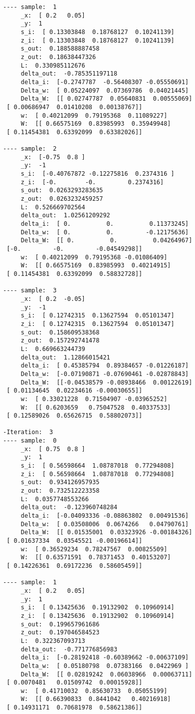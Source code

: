 \documentclass[10pt]{article}
\begin{document}
\begin{multicols}{3}
\begin{tiny}
\begin{verbatim}
---- sample:  1
     _x:  [ 0.2   0.05]
     _y:  1
     s_i:  [ 0.13303848  0.18768127  0.10241139]
     z_i:  [ 0.13303848  0.18768127  0.10241139]
     s_out:  0.188588887458
     z_out:  0.18638447326
     L:  0.330985112676
     delta_out:  -0.785351197118
     delta_i:  [-0.2747787  -0.56408307 -0.05550691]
     Delta_w:  [ 0.05224097  0.07369786  0.04021445]
     Delta_W:  [[ 0.02747787  0.05640831  0.00555069]
 [ 0.00686947  0.01410208  0.00138767]]
     w:  [ 0.40212099  0.79195368  0.11089227]
     W:  [[ 0.66575169  0.83985993  0.35949948]
 [ 0.11454381  0.63392099  0.63382026]]

---- sample:  2
     _x:  [-0.75  0.8 ]
     _y:  -1
     s_i:  [-0.40767872 -0.12275816  0.2374316 ]
     z_i:  [-0.        -0.         0.2374316]
     s_out:  0.0263293283635
     z_out:  0.0263232459257
     L:  0.526669702564
     delta_out:  1.02561209292
     delta_i:  [ 0.          0.          0.11373245]
     Delta_w:  [ 0.          0.         -0.12175636]
     Delta_W:  [[ 0.          0.          0.04264967]
 [-0.         -0.         -0.04549298]]
     w:  [ 0.40212099  0.79195368 -0.01086409]
     W:  [[ 0.66575169  0.83985993  0.40214915]
 [ 0.11454381  0.63392099  0.58832728]]

---- sample:  3
     _x:  [ 0.2  -0.05]
     _y:  -1
     s_i:  [ 0.12742315  0.13627594  0.05101347]
     z_i:  [ 0.12742315  0.13627594  0.05101347]
     s_out:  0.158609538368
     z_out:  0.157292741478
     L:  0.669663244739
     delta_out:  1.12866015421
     delta_i:  [ 0.45385794  0.89384657 -0.01226187]
     Delta_w:  [-0.07190871 -0.07690461 -0.02878843]
     Delta_W:  [[-0.04538579 -0.08938466  0.00122619]
 [ 0.01134645  0.02234616 -0.00030655]]
     w:  [ 0.33021228  0.71504907 -0.03965252]
     W:  [[ 0.6203659   0.75047528  0.40337533]
 [ 0.12589026  0.65626715  0.58802073]]

-Iteration:  3
---- sample:  0
     _x:  [ 0.75  0.8 ]
     _y:  1
     s_i:  [ 0.56598664  1.08787018  0.77294808]
     z_i:  [ 0.56598664  1.08787018  0.77294808]
     s_out:  0.934126957935
     z_out:  0.732512223358
     L:  0.0357748553266
     delta_out:  -0.123960748284
     delta_i:  [-0.04093336 -0.08863802  0.00491536]
     Delta_w:  [ 0.03508006  0.0674266   0.04790761]
     Delta_W:  [[ 0.01535001  0.03323926 -0.00184326]
 [ 0.01637334  0.03545521 -0.00196614]]
     w:  [ 0.36529234  0.78247567  0.00825509]
     W:  [[ 0.63571591  0.78371453  0.40153207]
 [ 0.14226361  0.69172236  0.58605459]]

---- sample:  1
     _x:  [ 0.2   0.05]
     _y:  1
     s_i:  [ 0.13425636  0.19132902  0.10960914]
     z_i:  [ 0.13425636  0.19132902  0.10960914]
     s_out:  0.199657961686
     z_out:  0.197046584523
     L:  0.322367093713
     delta_out:  -0.771776856983
     delta_i:  [-0.28192418 -0.60389662 -0.00637109]
     Delta_w:  [ 0.05180798  0.07383166  0.0422969 ]
     Delta_W:  [[ 0.02819242  0.06038966  0.00063711]
 [ 0.0070481   0.01509742  0.00015928]]
     w:  [ 0.41710032  0.85630733  0.05055199]
     W:  [[ 0.66390833  0.8441042   0.40216918]
 [ 0.14931171  0.70681978  0.58621386]]


\end{verbatim}
\end{tiny}
\end{multicols}
\end{document}
